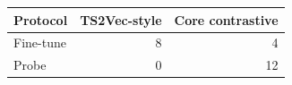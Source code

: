 \begin{tabular}{lrr}
\toprule
Protocol & TS2Vec-style & Core contrastive \\
\midrule
Fine-tune & 8 & 4 \\
Probe & 0 & 12 \\
\bottomrule
\end{tabular}
